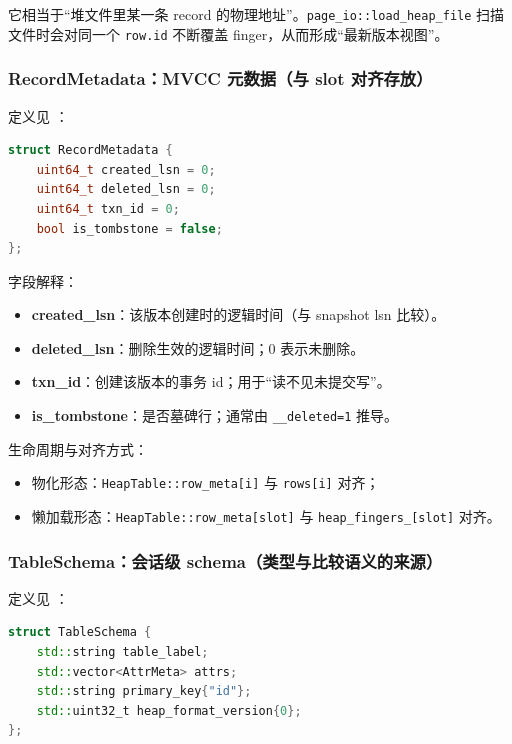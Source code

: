 它相当于“堆文件里某一条 record 的物理地址”。\texttt{page\_io::load\_heap\_file} 扫描文件时会对同一个 \texttt{row.id} 不断覆盖 finger，从而形成“最新版本视图”。

\subsubsection{RecordMetadata：MVCC 元数据（与 slot 对齐存放）}

定义见 ：

\begin{lstlisting}[language=C++,caption={RecordMetadata（原型）}]
struct RecordMetadata {
    uint64_t created_lsn = 0;
    uint64_t deleted_lsn = 0;
    uint64_t txn_id = 0;
    bool is_tombstone = false;
};
\end{lstlisting}

字段解释：

\begin{itemize}
  \item \textbf{created\_lsn}：该版本创建时的逻辑时间（与 snapshot lsn 比较）。
  \item \textbf{deleted\_lsn}：删除生效的逻辑时间；0 表示未删除。
  \item \textbf{txn\_id}：创建该版本的事务 id；用于“读不见未提交写”。
  \item \textbf{is\_tombstone}：是否墓碑行；通常由 \texttt{\_\_deleted=1} 推导。
\end{itemize}

生命周期与对齐方式：

\begin{itemize}
  \item 物化形态：\texttt{HeapTable::row\_meta[i]} 与 \texttt{rows[i]} 对齐；
  \item 懒加载形态：\texttt{HeapTable::row\_meta[slot]} 与 \texttt{heap\_fingers\_[slot]} 对齐。
\end{itemize}

\subsubsection{TableSchema：会话级 schema（类型与比较语义的来源）}

定义见 ：

\begin{lstlisting}[language=C++,caption={TableSchema（核心字段节选）}]
struct TableSchema {
    std::string table_label;
    std::vector<AttrMeta> attrs;
    std::string primary_key{"id"};
    std::uint32_t heap_format_version{0};
};
\end{lstlisting}

